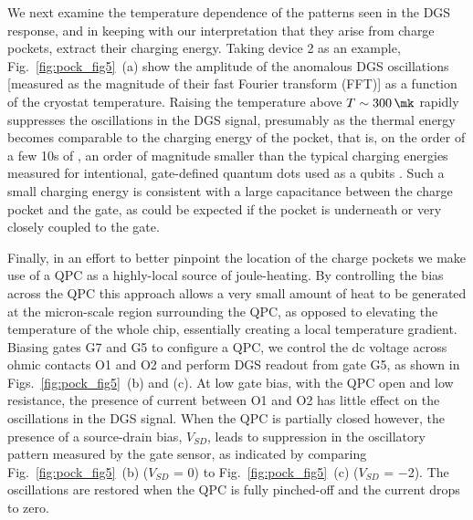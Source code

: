 We next examine the temperature dependence of the patterns seen in the DGS response, and in keeping with our interpretation that they arise from charge pockets, extract their charging energy. Taking device 2 as an example, Fig.~\ref{fig:pock_fig5}~(a) show the amplitude of the anomalous DGS oscillations [measured as the magnitude of their fast Fourier transform (FFT)] as a function of the cryostat temperature. Raising the temperature  above $T \sim \SI{300}{\mk}$ rapidly suppresses the oscillations in the DGS signal, presumably as the thermal energy becomes comparable to the charging energy of the pocket, that is, on the order of a few 10s of \si{\uev}, an order of magnitude smaller than the typical charging energies measured for intentional, gate-defined quantum dots used as a qubits \cite{Hanson:2007eg}. Such a small charging energy is consistent with a large capacitance between the charge pocket and the gate, as could be expected if the pocket is underneath or very closely coupled to the gate.

Finally, in an effort to better pinpoint the location of the charge pockets we make use of a QPC as a highly-local source of joule-heating. By controlling the bias across the QPC this approach allows a very small amount of heat to be generated at the micron-scale region surrounding the QPC, as opposed to elevating the temperature of the whole chip, essentially creating a local temperature gradient. Biasing gates G7 and G5 to configure a QPC, we control the dc voltage across ohmic contacts O1 and O2 and perform DGS readout from gate G5, as shown in Figs.~\ref{fig:pock_fig5}~(b) and (c). At low gate bias, with the QPC open and low resistance, the presence of current between O1 and O2 has little effect on the oscillations in the DGS signal. When the QPC is partially closed however, the presence of a source-drain bias, $V_{SD}$, leads to suppression in the oscillatory pattern measured by the gate sensor, as indicated by comparing Fig.~\ref{fig:pock_fig5}~(b) ($V_{SD}$ = \SI{0}{\mv}) to Fig.~\ref{fig:pock_fig5}~(c) ($V_{SD}$ = \SI{-2}{\mv}). The oscillations are restored when the QPC is fully pinched-off and the current drops to zero.

